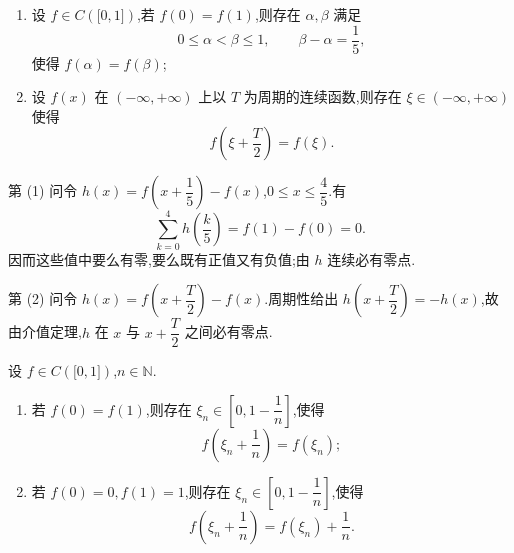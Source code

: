 \begin{example}
    \begin{enumerate}
        \item 设 $f\in C(\lbrack 0,1\rbrack)$,若 $f(0)=f(1)$,则存在 $\alpha,\beta$ 满足
              \[
                  0\leq\alpha<\beta\leq1, \qquad \beta-\alpha=\dfrac{1}{5},
              \]
              使得 $f(\alpha)=f(\beta)$;
        \item 设 $f(x)$ 在 $(-\infty,+\infty)$ 上以 $T$ 为周期的连续函数,则存在 $\xi\in(-\infty,+\infty)$ 使得
              \[
                  f\left(\xi+\dfrac{T}{2}\right)=f(\xi).
              \]
    \end{enumerate}
\end{example}
\exampleblank

\begin{solution}
    第 (1) 问令 $h(x)=f\left(x+\dfrac{1}{5}\right)-f(x)$,$0\leq x\leq\dfrac{4}{5}$.有
    \[
        \displaystyle\sum\limits_{k=0}^{4}h\left(\dfrac{k}{5}\right)=f(1)-f(0)=0.
    \]
    因而这些值中要么有零,要么既有正值又有负值;由 $h$ 连续必有零点.

    第 (2) 问令 $h(x)=f\left(x+\dfrac{T}{2}\right)-f(x)$.周期性给出 $h\left(x+\dfrac{T}{2}\right)=-h(x)$,故由介值定理,$h$ 在 $x$ 与 $x+\dfrac{T}{2}$ 之间必有零点.
\end{solution}

\begin{example}
    设 $f\in C(\lbrack 0,1\rbrack)$,$n\in\mathbb{N}$.
    \begin{enumerate}
        \item 若 $f(0)=f(1)$,则存在 $\xi_n\in\left[0,1-\dfrac{1}{n}\right]$,使得
              \[
                  f\left(\xi_n+\dfrac{1}{n}\right)=f(\xi_n);
              \]
        \item 若 $f(0)=0,f(1)=1$,则存在 $\xi_n\in\left[0,1-\dfrac{1}{n}\right]$,使得
              \[
                  f\left(\xi_n+\dfrac{1}{n}\right)=f(\xi_n)+\dfrac{1}{n}.
              \]
    \end{enumerate}
\end{example}
\exampleblank


